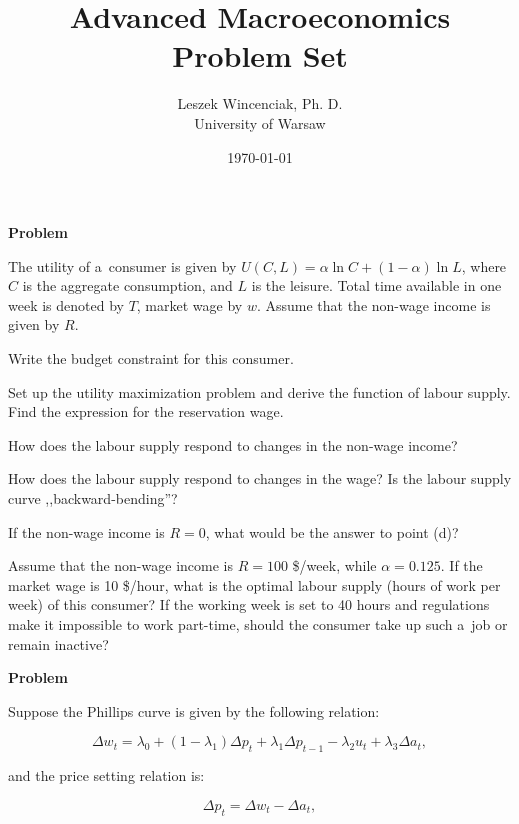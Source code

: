 \documentclass[a4paper, notitlepage, 11pt]{article}
\title{Advanced Macroeconomics Problem Set}
\author{Leszek Wincenciak, Ph. D.\\ University of Warsaw}
\date{\today}
\newcounter{zadlicz}[section]%
\newcommand{\tytul}[2]{\setcounter{equation}{0}\addtocounter{zadlicz}{1}\vspace{\abovedisplayskip}\noindent\textbf{#1\ \thezadlicz #2}}%
\begin{document}
\maketitle

\tytul{Problem}{}

\noindent%
The utility of a~consumer is given by $U(C,L)=\alpha\ln C + (1-\alpha)\ln L$, where $C$ is the aggregate consumption, and $L$ is the leisure. Total time available in one week is denoted by $T$, market wage by $w$. Assume that the non-wage income is given by $R$.

\begin{wylicz}
\item Write the budget constraint for this consumer.
\item Set up the utility maximization problem and derive the function of labour supply. Find the expression for the reservation wage.
\item How does the labour supply respond to changes in the non-wage income?
\item How does the labour supply respond to changes in the wage? Is the labour supply curve ,,backward-bending''?
\item If the non-wage income is $R=0$, what would be the answer to point (d)?
\end{wylicz}

Assume that the non-wage income is $R=100$ \$/week, while $\alpha=0.125$. If the market wage is 10 \$/hour, what is the optimal labour supply (hours of work per week) of this consumer? If the working week is set to 40 hours and regulations make it impossible to work part-time, should the consumer take up such a~job or remain inactive?

\tytul{Problem}{}

\noindent%
Suppose the Phillips curve is given by the following relation:

\begin{equation}
\Delta w_t=\lambda_0 + (1-\lambda_1)\Delta p_t + \lambda_1\Delta p_{t-1}-\lambda_2 u_t + \lambda_3\Delta a_t,\label{phillips}
\end{equation}

and the price setting relation is:

\begin{equation}
\Delta p_t=\Delta w_t - \Delta a_t,\label{price}
\end{equation}
\end{document}
